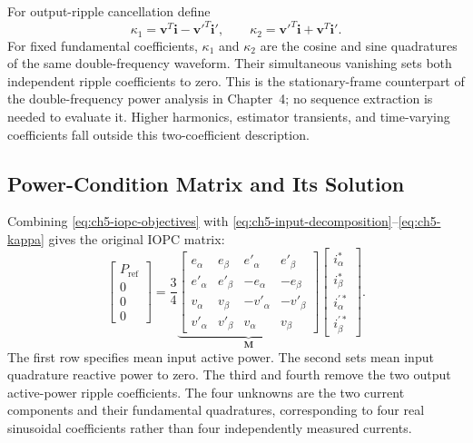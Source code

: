 For output-ripple cancellation define
\begin{equation}
\kappa_1=\mathbf v^T\mathbf i-\mathbf v'^T\mathbf i',\qquad
\kappa_2=\mathbf v'^T\mathbf i+\mathbf v^T\mathbf i'.
\label{eq:ch5-kappa}
\end{equation}
For fixed fundamental coefficients, $\kappa_1$ and $\kappa_2$ are the cosine and sine quadratures of the same double-frequency waveform. Their simultaneous vanishing sets both independent ripple coefficients to zero. This is the stationary-frame counterpart of the double-frequency power analysis in Chapter~4; no sequence extraction is needed to evaluate it. Higher harmonics, estimator transients, and time-varying coefficients fall outside this two-coefficient description.

\subsection{Power-Condition Matrix and Its Solution}
Combining \eqref{eq:ch5-iopc-objectives} with \eqref{eq:ch5-input-decomposition}--\eqref{eq:ch5-kappa} gives the original IOPC matrix:
\begin{equation}
\begin{bmatrix}P_{\mathrm{ref}}\\0\\0\\0\end{bmatrix}
=\frac34\underbrace{\begin{bmatrix}
e_\alpha&e_\beta&e'_\alpha&e'_\beta\\
e'_\alpha&e'_\beta&-e_\alpha&-e_\beta\\
v_\alpha&v_\beta&-v'_\alpha&-v'_\beta\\
v'_\alpha&v'_\beta&v_\alpha&v_\beta
\end{bmatrix}}_{\mathbf M}
\begin{bmatrix}i_\alpha^\ast\\i_\beta^\ast\\i_\alpha^{\prime\ast}\\i_\beta^{\prime\ast}\end{bmatrix}.
\label{eq:ch5-iopc-matrix}
\end{equation}
The first row specifies mean input active power. The second sets mean input quadrature reactive power to zero. The third and fourth remove the two output active-power ripple coefficients. The four unknowns are the two current components and their fundamental quadratures, corresponding to four real sinusoidal coefficients rather than four independently measured currents.

